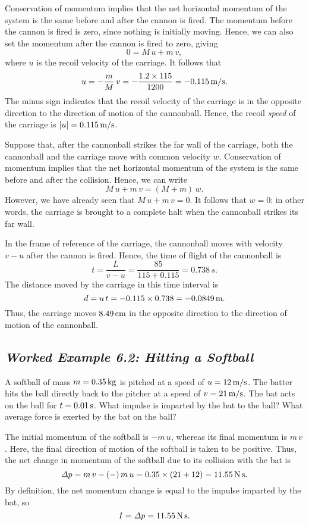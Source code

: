  Conservation of momentum implies that the net horizontal momentum
of the system is the same before and after the cannon is fired. The momentum before
the cannon is fired is zero, since nothing is initially moving. Hence, we can also set the momentum after
the cannon is fired to zero, giving
$$
0 = M\,u + m\,v,
$$
where $u$ is the recoil velocity of the carriage. It follows that
$$
u = - \frac{m}{M}\,v = -\frac{1.2\times 115}{1200} = -0.115\,{\rm m/s}.
$$
The minus sign indicates that the recoil velocity of the carriage is in the
opposite direction to the direction of motion of the cannonball. Hence, the
recoil {\em speed} of the carriage is $|u|= 0.115\,{\rm m/s}$.

Suppose that, after the cannonball strikes the far wall of the carriage, both
the cannonball and the carriage move with common velocity $w$. Conservation
of momentum implies that the net horizontal momentum of the system is the same
before and after the collision. Hence, we can write
$$
M\,u + m\,v= (M+m)\,w.
$$
However, we have already seen that $M\,u + m\,v=0$. It follows that $w=0$: in other
words, the carriage is brought to a complete halt when the cannonball strikes its far wall.

In the frame of reference of the carriage, the cannonball moves with velocity
$v-u$ after the cannon is fired. Hence, the time of flight of the cannonball is
$$
t = \frac{L}{v-u} = \frac{85}{115+0.115} = 0.738\,s.
$$
The distance moved by the carriage in this time interval is
$$
d = u\,t = -0.115\times 0.738 = -0.0849\,{\rm m}.
$$
Thus, the carriage moves $8.49\,{\rm cm}$ in the opposite direction to
the direction of motion of the cannonball.

\subsection*{\em Worked Example 6.2: Hitting a Softball}
 A softball of mass $m=0.35\,{\rm kg}$  is pitched
at a speed of $u=12\,{\rm m/s}$. The batter hits the ball directly back to
the pitcher at a speed of $v=21\,{\rm m/s}$. The bat acts on the ball
for $t=0.01\,{\rm s}$. What  impulse is imparted by the bat to the ball?
What  average force is exerted by the bat on the ball?

 The initial momentum of the softball is $-m\,u$, whereas its
final momentum is $m\,v$. Here, the final direction of motion of the softball
is taken to be positive. Thus, the net change in momentum of the softball due to
its collision with the bat is
$$
{\mit\Delta} p = m\,v - (-)\,m\,u = 0.35\times(21+12) = 11.55\,{\rm N\,s}.
$$
By definition, the net momentum change is equal to the impulse imparted
by the bat, so
$$
I = {\mit\Delta} p = 11.55\,{\rm N\,s}.
$$

